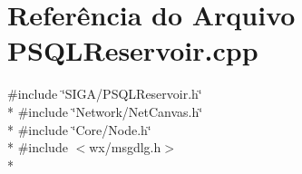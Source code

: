 \section{Referência do Arquivo P\+S\+Q\+L\+Reservoir.\+cpp}
\label{_p_s_q_l_reservoir_8cpp}
{\ttfamily \#include \char`\"{}S\+I\+G\+A/\+P\+S\+Q\+L\+Reservoir.\+h\char`\"{}}\\*
{\ttfamily \#include \char`\"{}Network/\+Net\+Canvas.\+h\char`\"{}}\\*
{\ttfamily \#include \char`\"{}Core/\+Node.\+h\char`\"{}}\\*
{\ttfamily \#include $<$wx/msgdlg.\+h$>$}\\*
